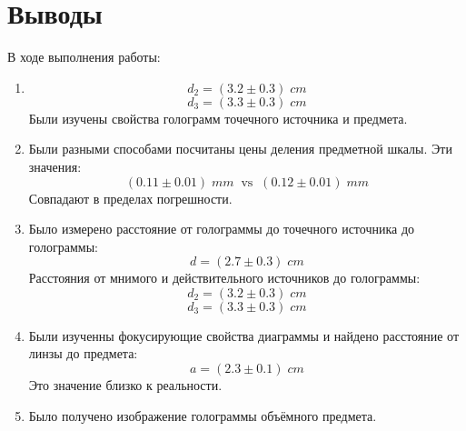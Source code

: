 \documentclass{article}
\begin{document}
\section{Выводы}
В ходе выполнения работы:
\begin{enumerate}
  \item \[ d_2 = (3.2 \pm 0.3)\; cm \]
\[ d_3 = (3.3 \pm 0.3)\; cm \]Были изучены свойства голограмм точечного источника и предмета.
  \item Были разными способами посчитаны цены деления предметной шкалы. Эти значения:
  \[(0.11 \pm 0.01)\; mm\;\; \text{vs}\;\;  (0.12\pm0.01)\;mm\]
  Совпадают в пределах погрешности.
  \item Было измерено расстояние от голограммы до точечного источника до голограммы:
  \[d= (2.7\pm0.3)\; cm\]
  Расстояния от мнимого и действительного источников до голограммы:
  \[ d_2 = (3.2 \pm 0.3)\; cm \]
  \[ d_3 = (3.3 \pm 0.3)\; cm \]
  \item Были изученны фокусирующие свойства диаграммы и найдено расстояние от линзы до предмета:
  \[a = (2.3\pm0.1)\;cm\]
  Это значение близко к реальности.
  \item Было получено изображение голограммы объёмного предмета.
\end{enumerate}
\end{document}
